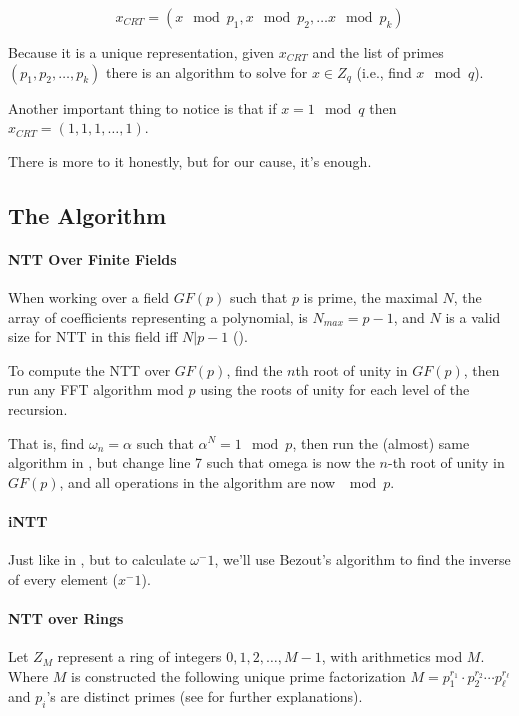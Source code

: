 $$ x_{CRT} = (x\mod p_1, x\mod p_2 ,\dots x\mod p_k ) $$



Because it is a unique representation, given $x_{CRT}$ and the list of
 primes $(p_1,p_2,\dots,p_k)$ there is an algorithm to solve for $x \in Z_q$
 (i.e., find $x \mod q$).


Another important thing to notice is that if  $x=1 \mod q$
 then $x_{CRT}= (1,1,1,\dots,1)$.


There is more to it honestly, but for our cause, it's enough.

\subsection{The Algorithm}

\paragraph[NTT Over Finite Fields]{\bf NTT Over Finite Fields} \label{ntt-field}
When working over a field $GF(p)$ such that $p$ is prime,
the maximal $N$, the array of coefficients representing a
polynomial, is $N_{max}=p-1$, and $N$ is a valid size for NTT
 in this field iff $N|p-1$ (\cite[III. number theoretic transforms]{ntt}). 


To compute the NTT over $GF(p)$, find the $n$th root of unity in $GF(p)$,
 then run any FFT algorithm mod $p$ using the roots
of unity for each level of the recursion.

That is, find $\omega_n=\alpha$ such that $\alpha^N=1 \mod p$, 
then run the (almost) same algorithm in , 
but change line 7 such that omega is now the $n$-th root of unity in $GF(p)$, and
all operations in the algorithm are now $\mod p$.

\paragraph{\bf iNTT}
Just like in , but to calculate $\omega^-1$, we'll
use Bezout's algorithm to find the inverse of every element ($x^-1$).



\paragraph[short]{\bf NTT over Rings}
Let $Z_M$ represent a ring of integers ${0,1,2,\dots , M-1}$,
with arithmetics mod $M$.
Where $M$ is constructed the following unique prime factorization
$M=p_{1}^{r_1}\cdot  p_{2}^{r_2} \cdots p_{\ell}^{r_\ell}$
and $p_i$'s are distinct primes (see \cite[NTT sec. III][]{ntt}
 for further explanations).

